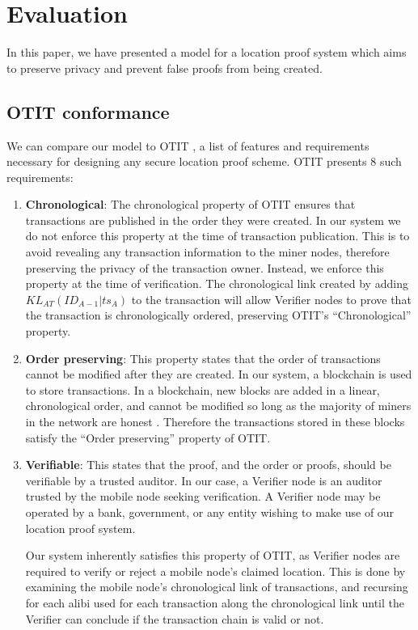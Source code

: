 \section{Evaluation}
In this paper, we have presented a model for a location proof system which aims to preserve privacy and prevent false proofs from being created.

\subsection{OTIT conformance}
We can compare our model to OTIT \cite{otit}, a list of features and requirements necessary for designing any secure location proof scheme. OTIT presents 8 such requirements:
\begin{enumerate}
\item[] \textbf{Chronological}: The chronological property of OTIT ensures that transactions are published in the order they were created. In our system we do not enforce this property at the time of transaction publication. This is to avoid revealing any transaction information to the miner nodes, therefore preserving the privacy of the transaction owner. Instead, we enforce this property at the time of verification. The chronological link created by adding $KL_{AT}(ID_{A-1}|ts_A)$ to the transaction will allow Verifier nodes to prove that the transaction is chronologically ordered, preserving OTIT's ``Chronological'' property.

\item[] \textbf{Order preserving}: This property states that the order of transactions cannot be modified after they are created. In our system, a blockchain is used to store transactions. In a blockchain, new blocks are added in a linear, chronological order, and cannot be modified so long as the majority of miners in the network are honest \cite{blueprint}. Therefore the transactions stored in these blocks satisfy the ``Order preserving'' property of OTIT. %

\item[] \textbf{Verifiable}: This states that the proof, and the order or proofs, should be verifiable by a trusted auditor. In our case, a Verifier node is an auditor trusted by the mobile node seeking verification. A Verifier node may be operated by a bank, government, or any entity wishing to make use of our location proof system.

Our system inherently satisfies this property of OTIT, as Verifier nodes are required to verify or reject a mobile node's claimed location. This is done by examining the mobile node's chronological link of transactions, and recursing for each alibi used for each transaction along the chronological link until the Verifier can conclude if the transaction chain is valid or not.


\end{enumerate}

